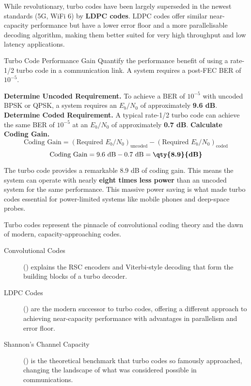 \begin{warningbox}
    While revolutionary, turbo codes have been largely superseded in the newest standards (5G, WiFi 6) by \textbf{LDPC codes}. LDPC codes offer similar near-capacity performance but have a lower error floor and a more parallelisable decoding algorithm, making them better suited for very high throughput and low latency applications.
\end{warningbox}

\begin{workedexample}{Turbo Code Performance Gain}
     Quantify the performance benefit of using a rate-1/2 turbo code in a communication link.
     A system requires a post-FEC BER of $10^{-5}$.
    \begin{derivationsteps}
        \step \textbf{Determine Uncoded Requirement.} To achieve a BER of $10^{-5}$ with uncoded BPSK or QPSK, a system requires an $E_b/N_0$ of approximately \textbf{9.6 dB}.
        \step \textbf{Determine Coded Requirement.} A typical rate-1/2 turbo code can achieve the same BER of $10^{-5}$ at an $E_b/N_0$ of approximately \textbf{0.7 dB}.
        \step \textbf{Calculate Coding Gain.}
        \[ \text{Coding Gain} = (\text{Required } E_b/N_0)_{\text{uncoded}} - (\text{Required } E_b/N_0)_{\text{coded}} \]
        \[ \text{Coding Gain} = 9.6 \text{ dB} - 0.7 \text{ dB} = \textbf{\qty{8.9}{dB}} \]
    \end{derivationsteps}
     The turbo code provides a remarkable 8.9 dB of coding gain. This means the system can operate with nearly \textbf{eight times less power} than an uncoded system for the same performance. This massive power saving is what made turbo codes essential for power-limited systems like mobile phones and deep-space probes.
\end{workedexample}

\begin{importantbox}[title={Further Reading}]
    Turbo codes represent the pinnacle of convolutional coding theory and the dawn of modern, capacity-approaching codes.
    \begin{description}
        \item[Convolutional Codes] () explains the RSC encoders and Viterbi-style decoding that form the building blocks of a turbo decoder.
        \item[LDPC Codes] () are the modern successor to turbo codes, offering a different approach to achieving near-capacity performance with advantages in parallelism and error floor.
        \item[Shannon's Channel Capacity] () is the theoretical benchmark that turbo codes so famously approached, changing the landscape of what was considered possible in communications.
    \end{description}
\end{importantbox}

